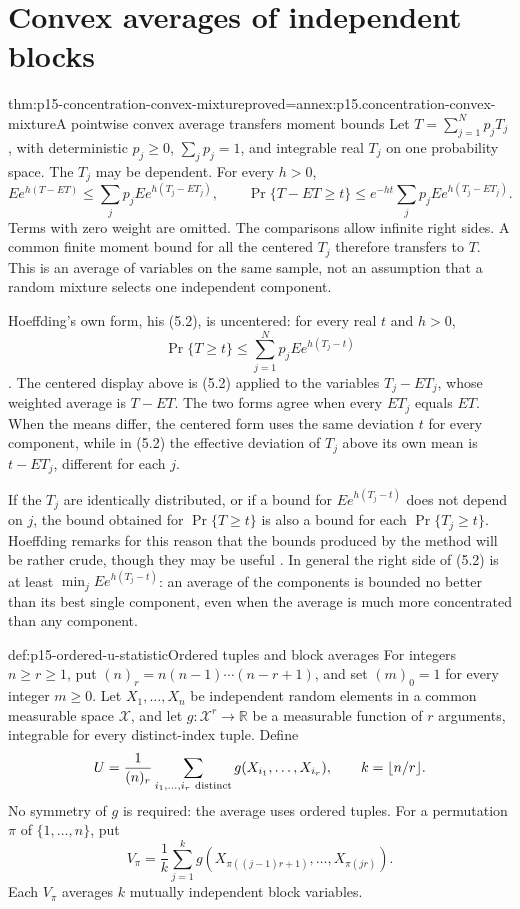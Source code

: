 \section{Convex averages of independent blocks}
\label{sec:p15-dependent-blocks}

\begin{hblemma}{thm:p15-concentration-convex-mixture}{proved=annex:p15.concentration-convex-mixture}{A pointwise convex average transfers moment bounds}
Let \(T=\sum_{j=1}^Np_jT_j\), with deterministic \(p_j\geq0\),
\(\sum_jp_j=1\), and integrable real \(T_j\) on one probability space.
The \(T_j\) may be dependent. For every \(h>0\),
\[
 E e^{h(T-ET)}
 \leq\sum_jp_j E e^{h(T_j-ET_j)},\qquad
 \Pr\{T-ET\geq t\}
 \leq e^{-ht}\sum_jp_j E e^{h(T_j-ET_j)}.
\]
Terms with zero weight are omitted. The comparisons allow infinite right
sides. A common finite moment
bound for all the centered \(T_j\) therefore transfers to \(T\).
This is an average of variables on the same sample, not an assumption
that a random mixture selects one independent component.

Hoeffding's own form, his (5.2), is uncentered: for every real \(t\) and
\(h>0\),
\[
 \Pr\{T\geq t\}\leq\sum_{j=1}^Np_jEe^{h(T_j-t)}
\]
\cite[p.~24]{Hoeffding1963BoundedSums}. The centered display above is
(5.2) applied to the variables \(T_j-ET_j\), whose weighted average is
\(T-ET\). The two forms agree when every \(ET_j\) equals \(ET\). When
the means differ, the centered form uses the same deviation \(t\) for
every component, while in (5.2) the effective deviation of \(T_j\) above
its own mean is \(t-ET_j\), different for each \(j\).

If the \(T_j\) are identically distributed, or if a bound for
\(Ee^{h(T_j-t)}\) does not depend on \(j\), the bound obtained for
\(\Pr\{T\geq t\}\) is also a bound for each \(\Pr\{T_j\geq t\}\).
Hoeffding remarks for this reason that the bounds produced by the
method will be rather crude, though they may be useful
\cite[p.~24]{Hoeffding1963BoundedSums}. In general the right side of
(5.2) is at least \(\min_jEe^{h(T_j-t)}\): an average of the components
is bounded no better than its best single component, even when the
average is much more concentrated than any component.
\end{hblemma}

\begin{hbdefinition}{def:p15-ordered-u-statistic}{Ordered tuples and block averages}
For integers \(n\geq r\geq1\), put
\((n)_r=n(n-1)\cdots(n-r+1)\), and set \((m)_0=1\) for every integer
\(m\geq0\). Let \(X_1,\ldots,X_n\) be independent
random elements in a common measurable space \(\mathcal X\), and let
\(g:\mathcal X^r\to\mathbb R\) be a measurable function of \(r\)
arguments, integrable for every distinct-index tuple. Define
\[
 U=\frac1{(n)_r}\sum_{i_1,\ldots,i_r\ {\rm distinct}}
                   g(X_{i_1},\ldots,X_{i_r}),\qquad k=\lfloor n/r\rfloor.
\]
No symmetry of \(g\) is required: the average uses ordered tuples.
For a permutation \(\pi\) of \(\{1,\ldots,n\}\), put
\[
 V_\pi=\frac1k\sum_{j=1}^k
 g(X_{\pi((j-1)r+1)},\ldots,X_{\pi(jr)}).
\]
Each \(V_\pi\) averages \(k\) mutually independent block variables.
\end{hbdefinition}

